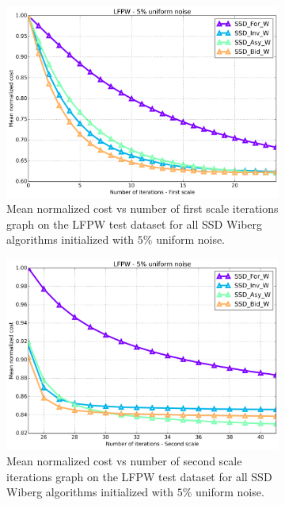 \begin{figure}[h!]
\begin{subfigure}{0.48\textwidth}
	\end{subfigure}
	\par\medskip
	\begin{subfigure}{0.48\textwidth}
	    \includegraphics[width=\textwidth]{experiments/algorithms/ssd_w/mean_cost_vs_iters1_ssd_w_5.png}
	    \caption{Mean normalized cost vs number of first scale iterations graph on the LFPW test dataset for all SSD Wiberg algorithms initialized with $5\%$ uniform noise.}
	    \label{fig:mean_cost_vs_iters1_ssd_w_5}
	\end{subfigure}
	\hfill
	\begin{subfigure}{0.48\textwidth}
	    \includegraphics[width=\textwidth]{experiments/algorithms/ssd_w/mean_cost_vs_iters2_ssd_w_5.png}
	    \caption{Mean normalized cost vs number of second scale iterations graph on the LFPW test dataset for all SSD Wiberg algorithms initialized with $5\%$ uniform noise.}
	    \label{fig:mean_cost_vs_iters2_ssd_w_5}
	\end{subfigure}
	\label{fig:ssd_w_5}
	\caption{}
\end{figure}


